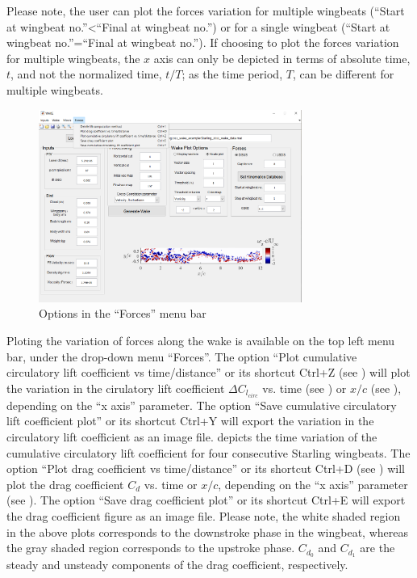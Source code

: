 \documentclass[12pt,a4paper]{article}
\begin{document}
Please note, the user can plot the forces variation for multiple wingbeats (``Start at wingbeat no.''<``Final at wingbeat no.'') or for a single wingbeat (``Start at wingbeat no.''=``Final at wingbeat no.''). If choosing to plot the forces variation for multiple wingbeats, the $x$ axis can only be depicted in terms of absolute time, $t$, and not the normalized time, $t/T$; as the time period, $T$, can be different for multiple wingbeats. 


\begin{figure}[ht!]
	\centering
	\includegraphics[width=0.77\textwidth]{Forces-menubar}
	\caption{Options in the ``Forces'' menu bar}
	\label{fig:GUI-Forces-menubar}
\end{figure}



Ploting the variation of forces along the wake is available on the top left menu bar, under the drop-down menu ``Forces''. 
The option ``Plot cumulative circulatory lift coefficient vs time/distance'' or its shortcut Ctrl+Z (see ) will plot the variation in the cirulatory lift coefficient $\Delta C_{l_{circ}}$ vs. time (see ) or $x/c$ (see ), depending on the ``x axis'' parameter. The option ``Save cumulative circulatory lift coefficient plot'' or its shortcut Ctrl+Y will export the variation in the circulatory lift coefficient as an image file.
 depicts the time variation of the cumulative circulatory lift coefficient for four consecutive Starling wingbeats.
The option ``Plot drag coefficient vs time/distance'' or its shortcut Ctrl+D (see ) will plot the drag coefficient $C_d$ vs. time or $x/c$, depending on the ``x axis'' parameter (see ). The option ``Save drag coefficient plot'' or its shortcut Ctrl+E will export the drag coefficient figure as an image file.
Please note, the white shaded region in the above plots corresponds to the downstroke phase in the wingbeat, whereas the gray shaded region corresponds to the upstroke phase. $C_{d_0}$ and $C_{d_1}$ are the steady and unsteady components of the drag coefficient, respectively.
\end{document}
